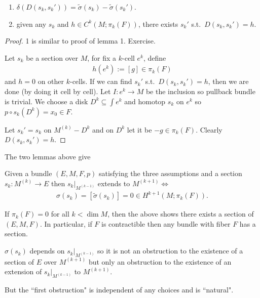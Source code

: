 \documentclass[12pt,class=article,crop=false]{standalone}
\begin{document}
\begin{lem}
\begin{enumerate}[label=(\arabic*)]
	\item $ \delta(D(s_k,s_k'))= \widetilde{ \sigma}(s_k) - \widetilde{ \sigma}(s_k')$.
	\item given any $ s_k$ and $ h \in C^{k}(M;\pi_k(F))$, there exists $ s_k'$ s.t.\ $ D(s_k,s_k') = h$.
\end{enumerate}
\end{lem}
\begin{proof}
1 is similar to proof of lemma 1. Exercise.

Let $ s_k$ be a section over $ M$, for fix a $ k$-cell  $ e^{k}$, define
\begin{align*}
	h(e^{k}) := [g] \in \pi_k(F)
\end{align*}
and $ h=0$ on other  $ k$-cells. If we can find  $ s_k'$ s.t.\ $ D(s_k,s_k') = h$, then we are done (by doing it cell by cell). Let $ I:e^{k} \to M$ be the inclusion so pullback bundle is trivial. We choose a disk $ D^{k} \subseteq \int e^{k}$ and homotop $ s_k$ on $ e^{k} $ so $ p \circ s_k(D^{k}) = x_0 \in F$.

Let $ s_k'=s_k$ on $ M^{(k)} - D^{k}$ and on $ D^{k}$ let it be $ -g \in \pi_k(F)$. Clearly $ D(s_k,s_k') = h$.
\end{proof}

The two lemmas above give
\begin{thm}
Given a bundle $ (E,M,F,p)$ satisfying the three assumptions and a section  $ s_k:M^{(k)} \to E$ then $ s_k|_{M^{(k-1)}}$ extends to $ M^{(k+1)} \iff$ 
\begin{align*}
	\sigma(s_k) = [\widetilde{ \sigma}(s_k)] = 0 \in H^{k+1}(M; \pi_k(F)).
\end{align*}
\end{thm}

\begin{remark}
If $ \pi_k(F) = 0$ for all $ k< \dim M$, then the above shows there exists a section of  $ (E,M,F)$. In particular, if  $ F$ is contractible then any bundle with fiber  $ F$ has a section.
\end{remark}
\begin{remark}
$ \sigma(s_k)$ depends on $ s_k|_{M^{(k-1)}}$ so it is not an obstruction to the existence of a section of $ E$ over  $ M^{(k+1)}$ but only an obstruction to the existence of an extension of $ s_k|_{M^{(k-1)}}$ to $ M^{(k+1)}$.
\end{remark}
But the ``first obstruction" is independent of any choices and is ``natural".
\end{document}
